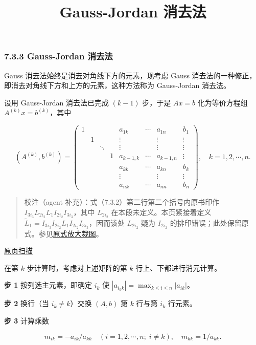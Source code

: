 \documentclass[
  10pt,
  fontset=fandol]{ctexart}
\title{Gauss-Jordan 消去法}
\author{}
\date{}
\begin{document}
\maketitle

\subsubsection{7.3.3 Gauss-Jordan 消去法}\label{gauss-jordan-ux6d88ux53bbux6cd5}

Gauss 消去法始终是消去对角线下方的元素，现考虑 Gauss 消去法的一种修正，即消去对角线下方和上方的元素，这种方法称为 Gauss-Jordan 消去法。

设用 Gauss-Jordan 消去法已完成 \((k-1)\) 步，于是 \(Ax=b\) 化为等价方程组 \(A^{(k)}x=b^{(k)}\)，其中

\[
(A^{(k)},b^{(k)})=\left(\begin{array}{ccccccc|c}
1&&&&a_{1k}&\cdots&a_{1n}&b_1\\
&1&&&\vdots&&\vdots&\vdots\\
&&\ddots&&\vdots&&\vdots&\vdots\\
&&&1&a_{k-1,k}&\cdots&a_{k-1,n}&\vdots\\
&&&&a_{kk}&\cdots&a_{kn}&b_k\\
&&&&\vdots&&\vdots&\vdots\\
&&&&a_{nk}&\cdots&a_{nn}&b_n
\end{array}\right),\quad k=1,2,\cdots,n.
\]

\begin{quote}
校注（agent 补充）：式（7.3.2）第二行第二个括号内原书印作 \(I_{3i_3}L_{2i_2}L_1I_{2i_2}I_{3i_3}\)，其中 \(L_{2i_2}\) 在本段未定义。本页紧接着定义 \(\widetilde{L}_1=I_{3i_3}I_{2i_2}L_1I_{2i_2}I_{3i_3}\)，因而该处 \(L_{2i_2}\) 疑为 \(I_{2i_2}\) 的排印错误；此处保留原式。参见\href{../assets/ch07a/pdf-188-permutation-detail.png}{原式放大裁图}。
\end{quote}

\href{../../source-images/pdf-189.jpeg}{原页扫描}

在第 \(k\) 步计算时，考虑对上述矩阵的第 \(k\) 行上、下都进行消元计算。

\textbf{步 1} 按列选主元素，即确定 \(i_k\) 使 \(|a_{i_kk}|=\max_{k\le i\le n}|a_{ik}|\)。

\textbf{步 2} 换行（当 \(i_k\ne k\)）交换 \((A,b)\) 第 \(k\) 行与第 \(i_k\) 行元素。

\textbf{步 3} 计算乘数

\[m_{ik}=-a_{ik}/a_{kk}\quad(i=1,2,\cdots,n;\;i\ne k),\quad m_{kk}=1/a_{kk}.\]
\end{document}
